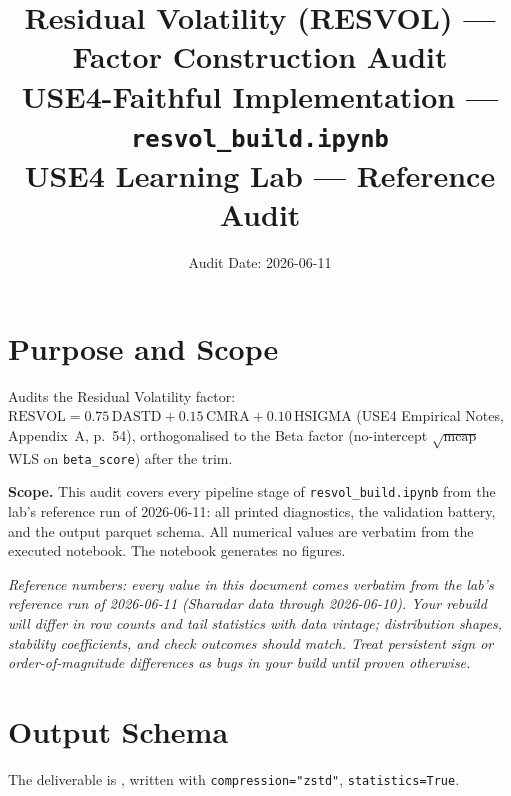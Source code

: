 \documentclass[11pt,a4paper]{article}
\title{\textbf{Residual Volatility (RESVOL) --- Factor Construction Audit}\\[2pt]
\large USE4-Faithful Implementation --- \texttt{resvol\_build.ipynb}\\[4pt]
\normalsize USE4 Learning Lab --- Reference Audit}
\author{Audit Date: 2026-06-11}
\date{}
\newcommand{\NOTE}[1]{\textcolor{note}{\textit{#1}}}
\begin{document}
\maketitle
\tableofcontents
\newpage

\section{Purpose and Scope}

Audits the Residual Volatility factor:
$\mathrm{RESVOL} = 0.75\,\mathrm{DASTD} + 0.15\,\mathrm{CMRA} + 0.10\,\mathrm{HSIGMA}$
(USE4 Empirical Notes, Appendix~A, p.~54), orthogonalised to the Beta factor
(no-intercept $\sqrt{\text{mcap}}$ WLS on \texttt{beta\_score}) after the trim.

\smallskip
\textbf{Scope.} This audit covers every pipeline stage of
\texttt{resvol\_build.ipynb} from the lab's reference run of 2026-06-11: all printed diagnostics, the
validation battery, and the output parquet schema. All numerical values are
verbatim from the executed notebook. The notebook generates no figures.

\NOTE{Reference numbers: every value in this document comes verbatim from the lab's reference run of 2026-06-11 (Sharadar data through 2026-06-10). Your rebuild will differ in row counts and tail statistics with data vintage; distribution shapes, stability coefficients, and check outcomes should match. Treat persistent sign or order-of-magnitude differences as bugs in your build until proven otherwise.}


\section{Output Schema}

The deliverable is , written with
\texttt{compression="zstd"}, \newline\texttt{statistics=True}.
\end{document}
